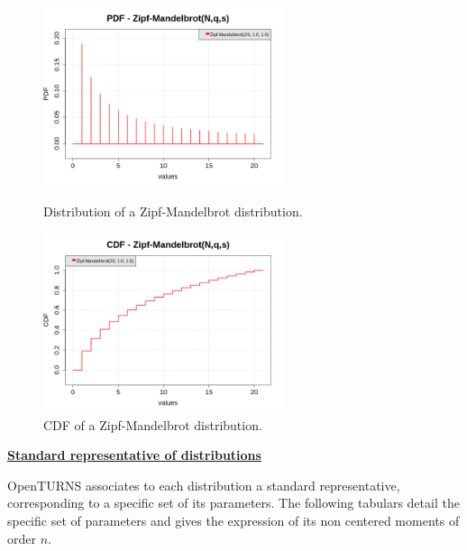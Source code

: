 {\begin{itemize}
\begin{figure}[H]
\begin{minipage}{8cm}
\begin{center}
\includegraphics[width=7cm]{Figures/pdf_ZipfMandelbrot_1.png}
\caption{Distribution of a  Zipf-Mandelbrot distribution.}
\label{PDFZipfMandelbrot}
\end{center}
\end{minipage}
\hfill
\begin{minipage}{8cm}
\begin{center}
\includegraphics[width=7cm]{Figures/cdf_ZipfMandelbrot_1.png}
\caption{CDF of a Zipf-Mandelbrot  distribution.}
\label{CDFZipfMandelbrot}
\end{center}
\end{minipage}
\end{figure}

\end{itemize}


\underline{\textbf{Standard representative of distributions}} \vspace{2mm}


OpenTURNS associates to each distribution a standard representative, corresponding to a specific set of its parameters. The following tabulars detail the specific set of parameters and gives the expression of its non centered moments of order $n$.


}
